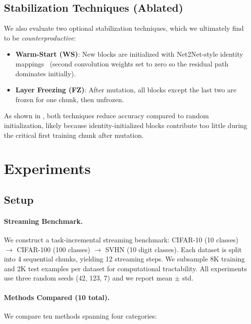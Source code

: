 \documentclass[10pt,twocolumn,letterpaper]{article}
\begin{document}
\subsection{Stabilization Techniques (Ablated)}

We also evaluate two optional stabilization techniques, which we ultimately find to be \emph{counterproductive}:

\begin{itemize}
    \item \textbf{Warm-Start (WS)}: New blocks are initialized with Net2Net-style identity mappings~\cite{chen2016net2net} (second convolution weights set to zero so the residual path dominates initially).
    \item \textbf{Layer Freezing (FZ)}: After mutation, all blocks except the last two are frozen for one chunk, then unfrozen.
\end{itemize}

As shown in , both techniques reduce accuracy compared to random initialization, likely because identity-initialized blocks contribute too little during the critical first training chunk after mutation.

\section{Experiments}
\label{sec:experiments}

\subsection{Setup}

\paragraph{Streaming Benchmark.}
We construct a task-incremental streaming benchmark: CIFAR-10 (10 classes) $\rightarrow$ CIFAR-100 (100 classes) $\rightarrow$ SVHN (10 digit classes). Each dataset is split into 4 sequential chunks, yielding 12 streaming steps. We subsample 8K training and 2K test examples per dataset for computational tractability. All experiments use three random seeds (42, 123, 7) and we report mean $\pm$ std.

\paragraph{Methods Compared (10 total).}
We compare ten methods spanning four categories:
\end{document}
